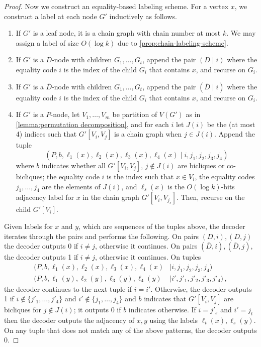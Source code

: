 \documentclass{article}
\newcommand\eqLabelSep{\mathbin|}
\begin{document}
\begin{proof}
Now we construct an equality-based labeling scheme. For a vertex $x$, we construct a label at each
node $G'$ inductively as follows.
\begin{enumerate}
  \item If $G'$ is a leaf node, it is a chain graph with chain number at most $k$. We may assign a
    label of size $O(\log k)$ due to \cref{prop:chain-labeling-scheme}.
  \item If $G'$ is a $D$-node with children $G_1, \dotsc, G_t$, append the pair $(D \eqLabelSep i)$ where
    the equality code $i$ is the index of the child $G_i$ that contains $x$, and recurse on $G_i$.
  \item If $G'$ is a $\overline D$-node with children $G_1, \dotsc, G_t$, append the pair
    $(\overline D \eqLabelSep i)$ where the equality code $i$ is the index of the child $G_i$ that
    contains $x$, and recurse on $G_i$.
  \item If $G'$ is a $P$-node, let $V_1, \dotsc, V_m$ be partition of $V(G')$ as in
    \cref{lemma:permutation decomposition}, and for each $i$ let $J(i)$ be the (at most 4) indices
    such that $G'[V_i,V_j]$ is a chain graph when $j \in J(i)$. Append the tuple
    \[
      (P, b, \ell_1(x),\ell_2(x), \ell_3(x), \ell_4(x) \eqLabelSep i, j_1,  j_2,  j_3, j_4)
    \]
    where $b$ indicates whether all $G'[V_i,V_j]$, $j \notin J(i)$ are bicliques or co-bicliques; the equality code $i$ is the index such that $x \in V_i$, the equality codes $j_1,
    \dotsc, j_4$ are the elements of $J(i)$, and $\ell_s(x)$ is the $O(\log k)$-bits adjacency
    label for $x$ in the chain graph $G'[V_i, V_{j_s}]$. Then, recurse on the child
    $G'[V_i]$.
\end{enumerate}
Given labels for $x$ and $y$, which are sequences of the tuples above, the decoder iterates
through the pairs and performs the following. On pairs $(D, i), (D,j)$ the decoder outputs 0 if $i
\neq j$, otherwise it continues. On pairs $(\overline D, i), (\overline D, j)$, the decoder
outputs 1 if $i \neq j$, otherwise it continues. On tuples
\begin{align*}
      (P, b, \ell_1(x),\ell_2(x), \ell_3(x), \ell_4(x) &\eqLabelSep i, j_1,  j_2,  j_3, j_4) \\
      (P, b, \ell_1(y),\ell_2(y), \ell_3(y), \ell_4(y) &\eqLabelSep i', j'_1,  j'_2,  j'_3, j'_4) \,,
\end{align*}
the decoder continues to the next tuple if $i=i'$. Otherwise,
the decoder outputs 1 if $i \notin \{j'_1, \dotsc, j'_4\}$ and $i' \notin \{j_1, \dotsc, j_4\}$
and $b$ indicates that $G'[V_i,V_j]$ are bicliques for $j \notin J(i)$; it outputs 0 if $b$
indicates otherwise. If $i = j'_s$ and $i' = j_t$ then the decoder outputs the adjacency of $x,y$
using the labels $\ell_t(x), \ell_s(y)$. On any tuple that does not match any of the above
patterns, the decoder outputs 0.


\end{proof}
\end{document}
